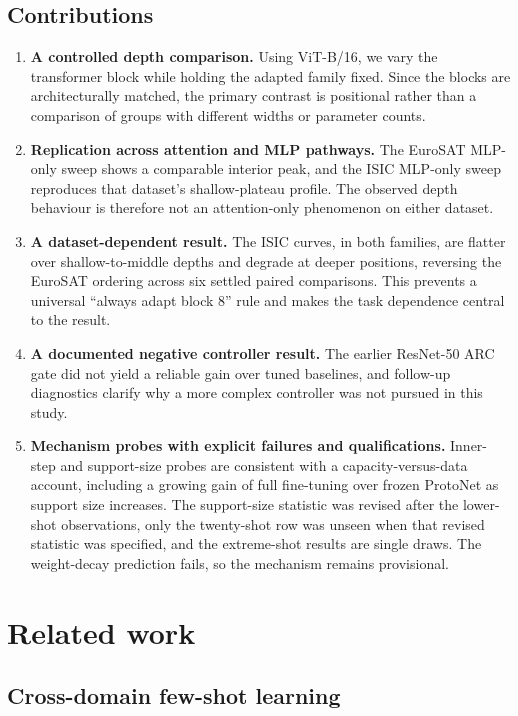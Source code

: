 \documentclass[11pt]{article}
\begin{document}
\subsection{Contributions}
\begin{enumerate}
  \item \textbf{A controlled depth comparison.} Using ViT-B/16, we vary the transformer block while holding the adapted family fixed. Since the blocks are architecturally matched, the primary contrast is positional rather than a comparison of groups with different widths or parameter counts.
  \item \textbf{Replication across attention and MLP pathways.} The EuroSAT MLP-only sweep shows a comparable interior peak, and the ISIC MLP-only sweep reproduces that dataset's shallow-plateau profile. The observed depth behaviour is therefore not an attention-only phenomenon on either dataset.
  \item \textbf{A dataset-dependent result.} The ISIC curves, in both families, are flatter over shallow-to-middle depths and degrade at deeper positions, reversing the EuroSAT ordering across six settled paired comparisons. This prevents a universal “always adapt block 8” rule and makes the task dependence central to the result.
  \item \textbf{A documented negative controller result.} The earlier ResNet-50 ARC gate did not yield a reliable gain over tuned baselines, and follow-up diagnostics clarify why a more complex controller was not pursued in this study.
  \item \textbf{Mechanism probes with explicit failures and qualifications.} Inner-step and support-size probes are consistent with a capacity-versus-data account, including a growing gain of full fine-tuning over frozen ProtoNet as support size increases. The support-size statistic was revised after the lower-shot observations, only the twenty-shot row was unseen when that revised statistic was specified, and the extreme-shot results are single draws. The weight-decay prediction fails, so the mechanism remains provisional.
\end{enumerate}

\section{Related work}
\label{sec:related}

\subsection{Cross-domain few-shot learning}
\end{document}

